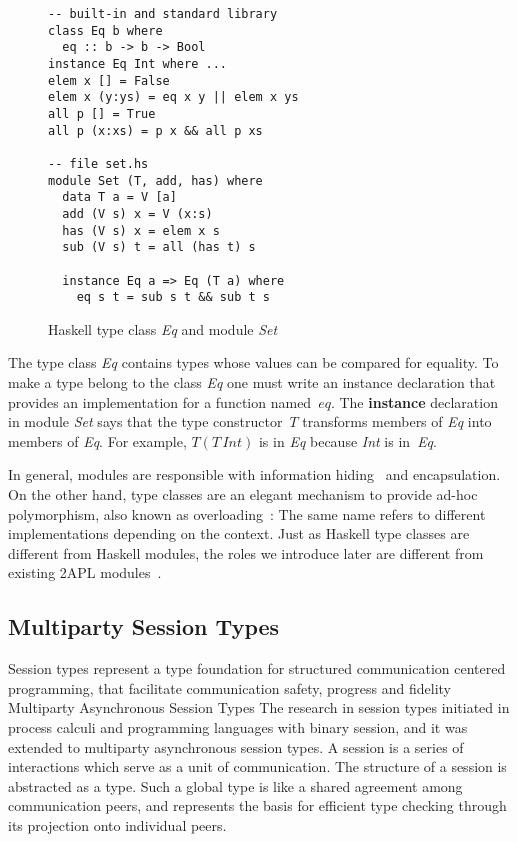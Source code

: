 \documentclass[a4paper,12pt,oneside,fleqn]{book} %
\theoremstyle{plain}
\theoremstyle{definition}
\theoremstyle{remark}
\begin{document}
\begin{figure}\footnotesize %
\begin{verbatim}
-- built-in and standard library
class Eq b where
  eq :: b -> b -> Bool
instance Eq Int where ...
elem x [] = False
elem x (y:ys) = eq x y || elem x ys
all p [] = True
all p (x:xs) = p x && all p xs

-- file set.hs
module Set (T, add, has) where
  data T a = V [a]
  add (V s) x = V (x:s)
  has (V s) x = elem x s
  sub (V s) t = all (has t) s

  instance Eq a => Eq (T a) where
    eq s t = sub s t && sub t s
\end{verbatim}
\caption{Haskell type class \textit{Eq} and module \textit{Set}}
\label{fig:haskell}
\end{figure} %


The type class \textit{Eq} contains types whose values can be compared for
equality. To make a type belong to the class \textit{Eq} one must write an
instance declaration that provides an implementation for a function
named~$eq$. The \textbf{instance} declaration in module \textit{Set} says
that the type constructor~$T$ transforms members of \textit{Eq} into
members of \textit{Eq}. For example, $T(T\,\mathit{Int})$ is in \textit{Eq}
because \textit{Int} is in~\textit{Eq}.

In general, modules are responsible with information
hiding~\cite{DBLP:journals/cacm/Parnas72a} and encapsulation.  On the other
hand, type classes are an elegant mechanism to provide ad-hoc polymorphism,
also known as overloading~\cite{DBLP:conf/popl/WadlerB89}: The same name
refers to different implementations depending on the context.  Just as
Haskell type classes are different from Haskell modules, the roles we
introduce later are different from existing 2APL
modules~\cite{dblp:conf/prima/dastanims08}.


\subsection{Multiparty Session Types} %

Session types represent a type foundation for structured communication
centered programming, that facilitate communication safety, progress and
fidelity \cite{} Multiparty Asynchronous Session Types The research in
session types initiated in process calculi and programming languages with
binary session, and it was extended to multiparty asynchronous session
types. A session is a series of interactions which serve as a unit of
communication. The structure of a session is abstracted as a type. Such a
global type is like a shared agreement among communication peers, and
represents the basis for efficient type checking through its projection
onto individual peers. 
\end{document}
